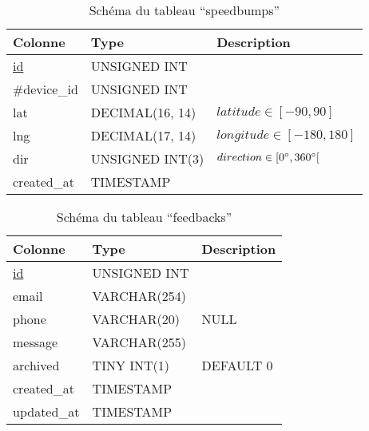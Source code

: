 \begin{table}[H]
   \centering
   \begin{tabular}{|l|p{4cm}|p{8cm}|}
   \hline
   \textbf{Colonne} & \textbf{Type} & \textbf{Description} \\
   \hline
   \underline{id} & UNSIGNED INT &\\ \hline
   \#device\_id & UNSIGNED INT & \\ \hline
   lat & DECIMAL(16, 14) & $latitude \in [-90, 90]$\\ \hline
   lng & DECIMAL(17, 14) & $longitude \in [-180, 180]$\\ \hline
   dir & UNSIGNED INT(3) & $direction \in [0\degree, 360\degree[$ \\ \hline
   created\_at & TIMESTAMP & \\ \hline
   \end{tabular}
   \caption{Schéma du tableau ``speedbumps''}
\end{table}
\begin{table}[H]
   \centering
   \begin{tabular}{|l|p{4cm}|p{8cm}|}
   \hline
   \textbf{Colonne} & \textbf{Type} & \textbf{Description} \\
   \hline
   \underline{id} & UNSIGNED INT &\\ \hline
   email & VARCHAR(254) & \cite{email-length} \\ \hline
   phone & VARCHAR(20) & NULL \\ \hline
   message & VARCHAR(255) & \\ \hline
   archived & TINY INT(1) & DEFAULT 0 \\ \hline
   created\_at & TIMESTAMP & \\ \hline
   updated\_at & TIMESTAMP & \\ \hline
   \end{tabular}
   \caption{Schéma du tableau ``feedbacks''}
\end{table}
